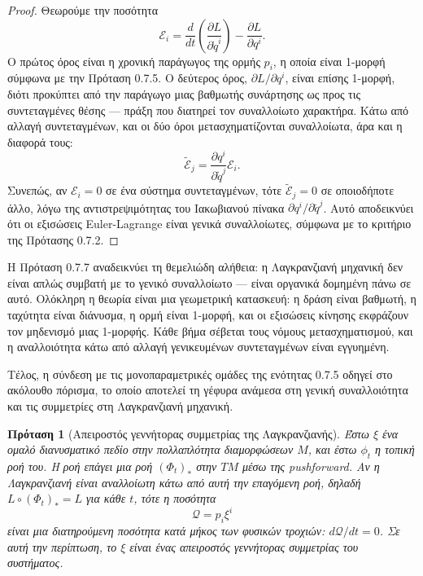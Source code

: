 \documentclass[11pt,a4paper,twoside,openright]{book}
\newtheorem{proposition}[lemma]{Πρόταση}
\begin{document}
\begin{proof}
Θεωρούμε την ποσότητα
\begin{equation}
\mathcal{E}_i = \frac{d}{dt} \left( \frac{\partial L}{\partial \dot{q}^i} \right) - \frac{\partial L}{\partial q^i}.
\end{equation}
Ο πρώτος όρος είναι η χρονική παράγωγος της ορμής $p_i$, η οποία είναι 1-μορφή σύμφωνα με την Πρόταση 0.7.5. Ο δεύτερος όρος, $\partial L / \partial q^i$, είναι επίσης 1-μορφή, διότι προκύπτει από την παράγωγο μιας βαθμωτής συνάρτησης ως προς τις συντεταγμένες θέσης — πράξη που διατηρεί τον συναλλοίωτο χαρακτήρα. Κάτω από αλλαγή συντεταγμένων, και οι δύο όροι μετασχηματίζονται συναλλοίωτα, άρα και η διαφορά τους:
\begin{equation}
\tilde{\mathcal{E}}_j = \frac{\partial q^i}{\partial \tilde{q}^j} \mathcal{E}_i.
\end{equation}
Συνεπώς, αν $\mathcal{E}_i = 0$ σε ένα σύστημα συντεταγμένων, τότε $\tilde{\mathcal{E}}_j = 0$ σε οποιοδήποτε άλλο, λόγω της αντιστρεψιμότητας του Ιακωβιανού πίνακα $\partial q^i / \partial \tilde{q}^j$. Αυτό αποδεικνύει ότι οι εξισώσεις Euler-Lagrange είναι γενικά συναλλοίωτες, σύμφωνα με το κριτήριο της Πρότασης 0.7.2.
\end{proof}

Η Πρόταση 0.7.7 αναδεικνύει τη θεμελιώδη αλήθεια: η Λαγκρανζιανή μηχανική δεν είναι απλώς συμβατή με το γενικό συναλλοίωτο — είναι οργανικά δομημένη πάνω σε αυτό. Ολόκληρη η θεωρία είναι μια γεωμετρική κατασκευή: η δράση είναι βαθμωτή, η ταχύτητα είναι διάνυσμα, η ορμή είναι 1-μορφή, και οι εξισώσεις κίνησης εκφράζουν τον μηδενισμό μιας 1-μορφής. Κάθε βήμα σέβεται τους νόμους μετασχηματισμού, και η αναλλοιότητα κάτω από αλλαγή γενικευμένων συντεταγμένων είναι εγγυημένη.

Τέλος, η σύνδεση με τις μονοπαραμετρικές ομάδες της ενότητας 0.7.5 οδηγεί στο ακόλουθο πόρισμα, το οποίο αποτελεί τη γέφυρα ανάμεσα στη γενική συναλλοιότητα και τις συμμετρίες στη Λαγκρανζιανή μηχανική.

\begin{proposition}[Απειροστός γεννήτορας συμμετρίας της Λαγκρανζιανής]
Έστω $\xi$ ένα ομαλό διανυσματικό πεδίο στην πολλαπλότητα διαμορφώσεων $M$, και έστω $\phi_t$ η τοπική ροή του. Η ροή επάγει μια ροή $(\Phi_t)_*$ στην $TM$ μέσω της pushforward. Αν η Λαγκρανζιανή είναι αναλλοίωτη κάτω από αυτή την επαγόμενη ροή, δηλαδή $L \circ (\Phi_t)_* = L$ για κάθε $t$, τότε η ποσότητα
\begin{equation}
\mathcal{Q} = p_i \xi^i \tag{0.42}
\end{equation}
είναι μια διατηρούμενη ποσότητα κατά μήκος των φυσικών τροχιών: $d\mathcal{Q}/dt = 0$. Σε αυτή την περίπτωση, το $\xi$ είναι ένας απειροστός γεννήτορας συμμετρίας του συστήματος.
\end{proposition}
\end{document}
